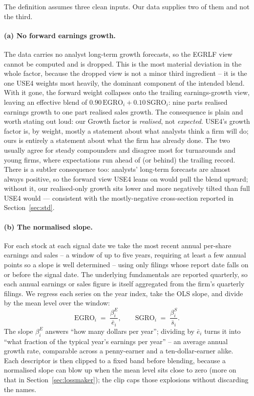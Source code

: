\documentclass[11pt]{article}
\theoremstyle{definition}
\theoremstyle{plain}
\theoremstyle{remark}
\begin{document}
The definition assumes three clean inputs. Our data supplies two of them and not the third.

\paragraph{(a) No forward earnings growth.} The data carries no analyst long-term growth forecasts, so the EGRLF view cannot be computed and is dropped. This is the most material deviation in the whole factor, because the dropped view is not a minor third ingredient -- it is the one USE4 weights most heavily, the dominant component of the intended blend. With it gone, the forward weight collapses onto the trailing earnings-growth view, leaving an effective blend of $0.90\,\text{EGRO}_i + 0.10\,\text{SGRO}_i$: nine parts realised earnings growth to one part realised sales growth. The consequence is plain and worth stating out loud: our Growth factor is \emph{realised}, not \emph{expected}. USE4's growth factor is, by weight, mostly a statement about what analysts think a firm will do; ours is entirely a statement about what the firm has already done. The two usually agree for steady compounders and disagree most for turnarounds and young firms, where expectations run ahead of (or behind) the trailing record. There is a subtler consequence too: analysts' long-term forecasts are almost always positive, so the forward view USE4 leans on would pull the blend upward; without it, our realised-only growth sits lower and more negatively tilted than full USE4 would --- consistent with the mostly-negative cross-section reported in Section~\ref{sec:std}.

\paragraph{(b) The normalised slope.} For each stock at each signal date we take the most recent annual per-share earnings and sales -- a window of up to five years, requiring at least a few annual points so a slope is well determined -- using only filings whose report date falls on or before the signal date. The underlying fundamentals are reported quarterly, so each annual earnings or sales figure is itself aggregated from the firm's quarterly filings. We regress each series on the year index, take the OLS slope, and divide by the mean level over the window:
\[
\text{EGRO}_i \;=\; \frac{\beta^{E}_i}{\bar e_i},
\qquad
\text{SGRO}_i \;=\; \frac{\beta^{S}_i}{\bar s_i}.
\]
The slope $\beta^{E}_i$ answers ``how many dollars per year''; dividing by $\bar e_i$ turns it into ``what fraction of the typical year's earnings per year'' -- an average annual growth rate, comparable across a penny-earner and a ten-dollar-earner alike. Each descriptor is then clipped to a fixed band before blending, because a normalised slope can blow up when the mean level sits close to zero (more on that in Section~\ref{sec:lossmaker}); the clip caps those explosions without discarding the names.
\end{document}

